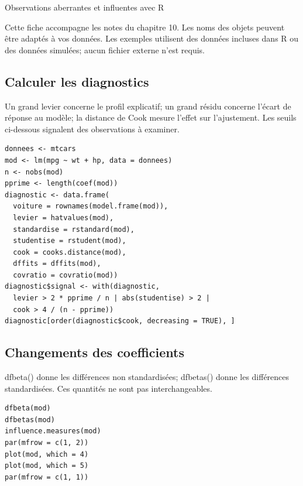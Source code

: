 \documentclass[letterpaper,11pt]{article}
\begin{document}
\begin{center}{\Large Observations aberrantes et influentes avec R}\end{center}
Cette fiche accompagne les notes du chapitre 10. Les noms des objets peuvent être adaptés à vos données. Les exemples utilisent des données incluses dans R ou des données simulées; aucun fichier externe n’est requis.

\par\medskip\noindent\begin{minipage}{\linewidth}
\subsection*{Calculer les diagnostics}
Un grand levier concerne le profil explicatif; un grand résidu concerne l'écart de réponse au modèle; la distance de Cook mesure l'effet sur l'ajustement. Les seuils ci-dessous signalent des observations à examiner.
\begin{Verbatim}
donnees <- mtcars
mod <- lm(mpg ~ wt + hp, data = donnees)
n <- nobs(mod)
pprime <- length(coef(mod))
diagnostic <- data.frame(
  voiture = rownames(model.frame(mod)),
  levier = hatvalues(mod),
  standardise = rstandard(mod),
  studentise = rstudent(mod),
  cook = cooks.distance(mod),
  dffits = dffits(mod),
  covratio = covratio(mod))
diagnostic$signal <- with(diagnostic,
  levier > 2 * pprime / n | abs(studentise) > 2 |
  cook > 4 / (n - pprime))
diagnostic[order(diagnostic$cook, decreasing = TRUE), ]
\end{Verbatim}

\end{minipage}\par
\par\medskip\noindent\begin{minipage}{\linewidth}
\subsection*{Changements des coefficients}
dfbeta() donne les différences non standardisées; dfbetas() donne les différences standardisées. Ces quantités ne sont pas interchangeables.
\begin{Verbatim}
dfbeta(mod)
dfbetas(mod)
influence.measures(mod)
par(mfrow = c(1, 2))
plot(mod, which = 4)
plot(mod, which = 5)
par(mfrow = c(1, 1))
\end{Verbatim}

\end{minipage}\par
\end{document}
